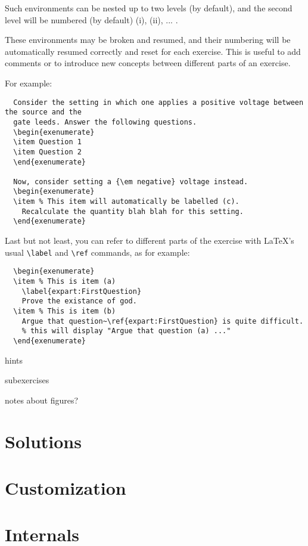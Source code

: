 \documentclass[11pt,a4paper]{article}
\begin{document}
Such  environments can be nested up to two levels (by default), and
the second level will be numbered (by default) (i), (ii), ... .

These environments may be broken and resumed, and their numbering will be automatically
resumed correctly and reset for each exercise. This is useful to add comments or to
introduce new concepts between different parts of an exercise.

For example:
\begin{pkgverbatim}\begin{verbatim}
  Consider the setting in which one applies a positive voltage between the source and the
  gate leeds. Answer the following questions.
  \begin{exenumerate}
  \item Question 1
  \item Question 2
  \end{exenumerate}

  Now, consider setting a {\em negative} voltage instead.
  \begin{exenumerate}
  \item % This item will automatically be labelled (c).
    Recalculate the quantity blah blah for this setting.
  \end{exenumerate}
\end{verbatim}\end{pkgverbatim}

Last but not least, you can refer to different parts of the exercise with \LaTeX's usual
\texttt{\textbackslash label} and \texttt{\textbackslash ref}
commands, as for example:
\begin{pkgverbatim}\begin{verbatim}
  \begin{exenumerate}
  \item % This is item (a)
    \label{expart:FirstQuestion}
    Prove the existance of god.
  \item % This is item (b)
    Argue that question~\ref{expart:FirstQuestion} is quite difficult.
    % this will display "Argue that question (a) ..."
  \end{exenumerate}
\end{verbatim}\end{pkgverbatim}


hints

subexercises

notes about figures?

\section{Solutions}


\section{Customization}


\section{Internals}
\end{document}
